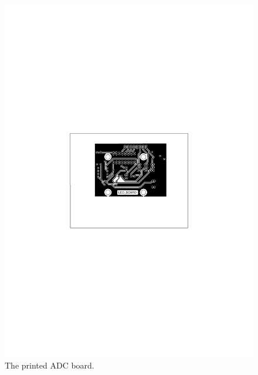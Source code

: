 \begin{figure}[ht]                     %
\centering
 \includegraphics[scale=1,trim={7.6cm 13.5cm 8cm 11.8cm},clip]{img/printed_adc_board}
 \caption{The printed ADC board.}\label{fig:adc_board}
\end{figure}
